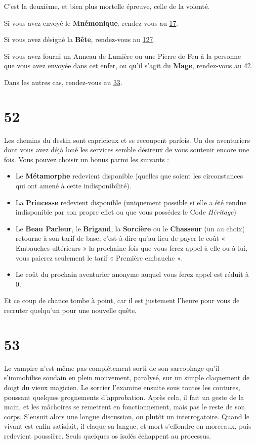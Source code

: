 \documentclass{report}
\newcommand{\gsection}[1]{
    \section{#1}
    \label{section-#1}
}
\newcommand{\glink}[1]{\hyperref[section-#1]{#1}}
\newcommand{\hero}[1]{\textbf{#1}}
\begin{document}
C'est la deuxième, et bien plus mortelle épreuve, celle de la volonté.

Si vous avez envoyé le \hero{Mnémonique}, rendez-vous au \glink{17}.

Si vous avez désigné la \hero{Bête}, rendez-vous au \glink{127}.

Si vous avez fourni un Anneau de Lumière ou une Pierre de Feu à la personne que vous avez envoyée dans cet enfer, ou qu'il s'agit du \hero{Mage}, rendez-vous au \glink{42}.

Dans les autres cas, rendez-vous au \glink{33}.

\gsection{52}

Les chemins du destin sont capricieux et se recoupent parfois. Un des aventuriers dont vous avez déjà loué les services semble désireux de vous soutenir encore une fois. Vous pouvez choisir un bonus parmi les suivants :

\begin{itemize}
\item Le \hero{Métamorphe} redevient disponible (quelles que soient les circonstances qui ont amené à cette indisponibilité).
\item La \hero{Princesse} redevient disponible (uniquement possible si elle a été rendue indisponible par son propre effet ou que vous possédez le Code \emph{Héritage})
\item Le \textbf{Beau Parleur}, le \textbf{Brigand}, la \textbf{Sorcière} ou le \textbf{Chasseur} (un au choix) retourne à son tarif de base, c'est-à-dire qu'au lieu de payer le coût « Embauches ultérieurs » la prochaine fois que vous ferez appel à elle ou à lui, vous paierez seulement le tarif « Première embauche ».
\item Le coût du prochain aventurier anonyme auquel vous ferez appel est réduit à 0.
\end{itemize}

Et ce coup de chance tombe à point, car il est justement l'heure pour vous de recruter quelqu'un pour une nouvelle quête.

\gsection{53}

Le vampire n'est même pas complètement sorti de son sarcophage qu'il s'immobilise soudain en plein mouvement, paralysé, sur un simple claquement de doigt du vieux magicien. Le sorcier l'examine ensuite sous toutes les coutures, poussant quelques grognements d'approbation. Après cela, il fait un geste de la main, et les mâchoires se remettent en fonctionnement, mais pas le reste de son corps. S'ensuit alors une longue discussion, ou plutôt un interrogatoire. Quand le vivant est enfin satisfait, il claque sa langue, et mort s'effondre en morceaux, puis redevient poussière. Seuls quelques os isolés échappent au processus.
\end{document}
